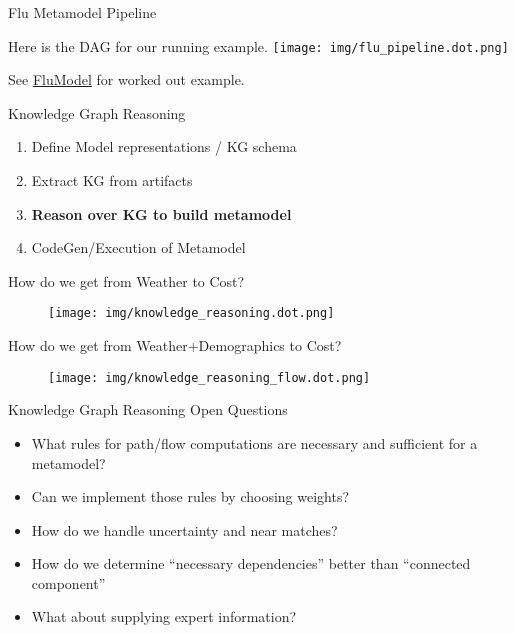 \documentclass[ignorenonframetext,]{beamer}
\providecommand{\tightlist}{%
  \setlength{\itemsep}{0pt}\setlength{\parskip}{0pt}}
\begin{document}
\begin{frame}{Flu Metamodel Pipeline}
\protect\hypertarget{flu-metamodel-pipeline}{}

Here is the DAG for our running example.
\texttt{[image: img/flu\_pipeline.dot.png]}

See \href{@ref}{FluModel} for worked out example.

\end{frame}

\begin{frame}{Knowledge Graph Reasoning}
\protect\hypertarget{knowledge-graph-reasoning}{}

\begin{enumerate}
\tightlist
\item
  Define Model representations / KG schema
\item
  Extract KG from artifacts
\item
  \textbf{Reason over KG to build metamodel}
\item
  CodeGen/Execution of Metamodel
\end{enumerate}

\end{frame}

\begin{frame}{How do we get from Weather to Cost?}
\protect\hypertarget{how-do-we-get-from-weather-to-cost}{}

\begin{figure}
\centering
\texttt{[image: img/knowledge\_reasoning.dot.png]}
\end{figure}

\end{frame}

\begin{frame}{How do we get from Weather+Demographics to Cost?}
\protect\hypertarget{how-do-we-get-from-weatherdemographics-to-cost}{}

\begin{figure}
\centering
\texttt{[image: img/knowledge\_reasoning\_flow.dot.png]}
\end{figure}

\end{frame}

\begin{frame}{Knowledge Graph Reasoning Open Questions}
\protect\hypertarget{knowledge-graph-reasoning-open-questions}{}

\begin{itemize}
\tightlist
\item
  What rules for path/flow computations are necessary and sufficient for
  a metamodel?
\item
  Can we implement those rules by choosing weights?
\item
  How do we handle uncertainty and near matches?
\item
  How do we determine ``necessary dependencies'' better than ``connected
  component''
\item
  What about supplying expert information?
\end{itemize}

\end{frame}
\end{document}
